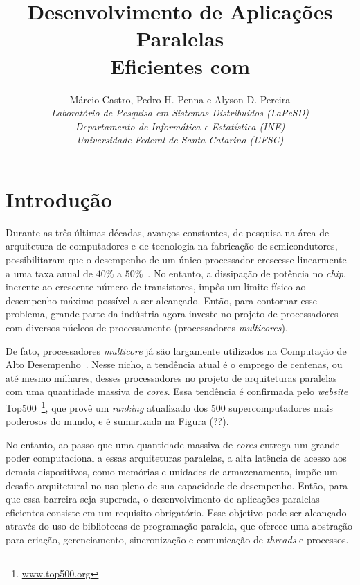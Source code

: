 \documentclass{SBCbookchapter}
\author{%
	Márcio Castro, Pedro H. Penna e Alyson D. Pereira                  \\
	\textit{Laboratório de Pesquisa em Sistemas Distribuídos (LaPeSD)} \\
	\textit{Departamento de Informática e Estatística (INE)}           \\
	\textit{Universidade Federal de Santa Catarina (UFSC)}
}
\title{Desenvolvimento de Aplicações Paralelas\\Eficientes com \openmp}
\begin{document}
\maketitle

\begin{resumo}
	\lipsum[1]
\end{resumo}

\section{Introdução}

	Durante as três últimas décadas, avanços constantes, de pesquisa na
	área de arquitetura de computadores e de tecnologia na fabricação de
	semicondutores, possibilitaram que o desempenho de um único
	processador crescesse linearmente a uma taxa anual de $40\%$ a
	$50\%$~\cite{LARUS08}. No entanto, a dissipação de potência no
	\textit{chip}, inerente ao crescente número de transistores, impôs
	um limite físico ao desempenho máximo possível a ser alcançado.
	Então, para contornar esse problema, grande parte da indústria agora
	investe no projeto de processadores com diversos núcleos de
	processamento (processadores \textit{multicores}).

	De fato, processadores \textit{multicore} já são largamente
	utilizados na Computação de Alto Desempenho~\cite{Asanovic09}.
	Nesse nicho, a tendência atual é o emprego de centenas, ou até mesmo
	milhares, desses processadores no projeto de arquiteturas paralelas
	com uma quantidade massiva de \textit{cores}. Essa tendência é
	confirmada pelo \textit{website}
	Top500~\footnote{\url{www.top500.org}}, que provê um
	\textit{ranking} atualizado	dos 500 supercomputadores mais poderosos
	do mundo, e é sumarizada na Figura (??).
		
	No entanto, ao passo que uma quantidade massiva de \textit{cores}
	entrega um grande poder computacional a essas arquiteturas
	paralelas, a alta latência de acesso aos demais dispositivos, como
	memórias e unidades de armazenamento, impõe um desafio arquitetural
	no uso pleno de sua capacidade de desempenho. Então, para que essa
	barreira seja superada, o desenvolvimento de aplicações paralelas
	eficientes consiste em um requisito obrigatório. Esse objetivo pode
	ser alcançado através do uso de bibliotecas de programação paralela,
	que oferece uma abstração para criação, gerenciamento, sincronização
	e comunicação de \textit{threads} e processos.
\end{document}
